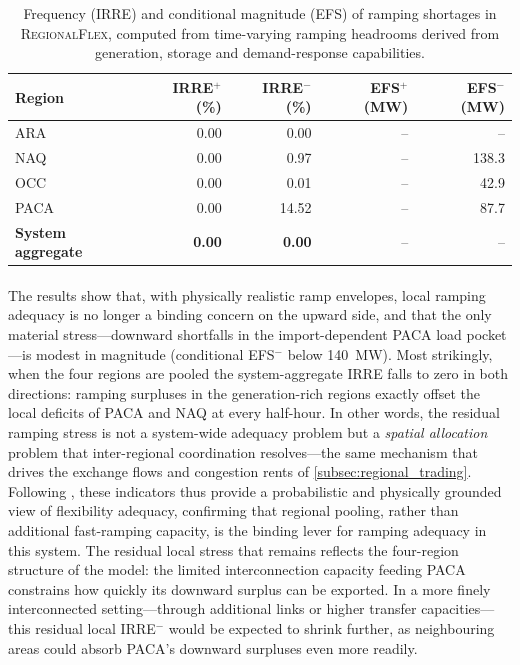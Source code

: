 \documentclass[12pt]{article}
\begin{document}
\begin{table}[H]
\centering
\begin{tabular}{lrrrr}
\hline
Region & IRRE$^{+}$ (\%) & IRRE$^{-}$ (\%) &
EFS$^{+}$ (MW) & EFS$^{-}$ (MW) \\
\hline
ARA          &  0.00 &  0.00 & --    & --    \\
NAQ             &  0.00 &  0.97 & --    & 138.3 \\
OCC                       &  0.00 &  0.01 & --    &  42.9 \\
PACA    &  0.00 & 14.52 & --    &  87.7 \\
\hline
\textbf{System aggregate}       & \textbf{0.00} & \textbf{0.00} &
-- & -- \\
\hline
\end{tabular}
\caption[IRRE and EFS metrics (regional and system levels)]{Frequency
(IRRE) and conditional magnitude (EFS) of ramping shortages in
\textsc{RegionalFlex}, computed from time-varying ramping headrooms
derived from generation, storage and demand-response capabilities.}
\label{tab:irre_efs_yaml}
\end{table}

\paragraph{}
The results show that, with physically realistic ramp envelopes, local ramping
adequacy is no longer a binding concern on the upward side, and that the only
material stress---downward shortfalls in the import-dependent PACA load
pocket---is modest in magnitude (conditional \textsc{EFS}$^{-}$ below
\SI{140}{MW}). Most strikingly, when the four regions are pooled the
system-aggregate \textsc{IRRE} falls to zero in both directions: ramping
surpluses in the generation-rich regions exactly offset the local deficits of
PACA and NAQ at every half-hour. In other words, the residual ramping stress is
not a system-wide adequacy problem but a \emph{spatial allocation} problem that
inter-regional coordination resolves---the same mechanism that drives the
exchange flows and congestion rents of \cref{subsec:regional_trading}.
Following \citet{abdin2018integrated}, these indicators thus provide
a probabilistic and physically grounded view of flexibility adequacy,
confirming that regional pooling, rather than additional fast-ramping capacity,
is the binding lever for ramping adequacy in this system. The residual local
stress that remains reflects the four-region structure of the model: the limited
interconnection capacity feeding PACA constrains how quickly its downward surplus
can be exported. In a more finely interconnected setting---through additional
links or higher transfer capacities---this residual local \textsc{IRRE}$^{-}$
would be expected to shrink further, as neighbouring areas could absorb PACA's
downward surpluses even more readily.
\end{document}
